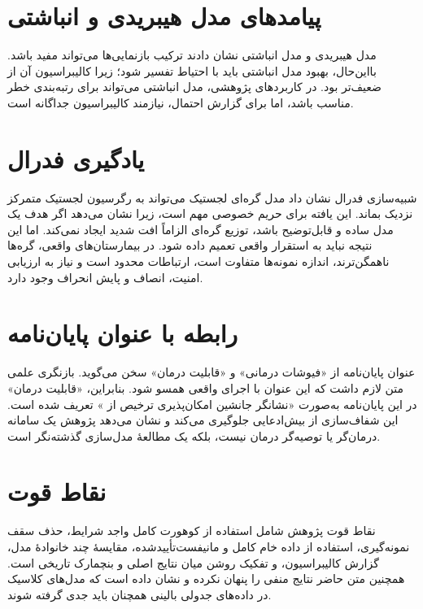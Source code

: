 \section{پیامدهای مدل هیبریدی و انباشتی}
مدل هیبریدی و مدل انباشتی نشان دادند ترکیب بازنمایی‌ها می‌تواند مفید باشد. بااین‌حال، بهبود مدل انباشتی باید با احتیاط تفسیر شود؛ زیرا کالیبراسیون آن از  ضعیف‌تر بود. در کاربردهای پژوهشی، مدل انباشتی می‌تواند برای رتبه‌بندی خطر مناسب باشد، اما برای گزارش احتمال، نیازمند کالیبراسیون جداگانه است.

\section{یادگیری فدرال}
شبیه‌سازی فدرال نشان داد مدل گره‌ای لجستیک می‌تواند به رگرسیون لجستیک متمرکز نزدیک بماند. این یافته برای حریم خصوصی مهم است، زیرا نشان می‌دهد اگر هدف یک مدل ساده و قابل‌توضیح باشد، توزیع گره‌ای الزاماً افت شدید ایجاد نمی‌کند. اما این نتیجه نباید به استقرار واقعی تعمیم داده شود. در بیمارستان‌های واقعی، گره‌ها ناهمگن‌ترند، اندازه نمونه‌ها متفاوت است، ارتباطات محدود است و نیاز به ارزیابی امنیت، انصاف و پایش انحراف وجود دارد.

\section{رابطه با عنوان پایان‌نامه}
عنوان پایان‌نامه از «فیوشات درمانی» و «قابلیت درمان» سخن می‌گوید. بازنگری علمی متن لازم داشت که این عنوان با اجرای واقعی همسو شود. بنابراین، «قابلیت درمان» در این پایان‌نامه به‌صورت «نشانگر جانشین امکان‌پذیری ترخیص از » تعریف شده است. این شفاف‌سازی از بیش‌ادعایی جلوگیری می‌کند و نشان می‌دهد پژوهش یک سامانه درمان‌گر یا توصیه‌گر درمان نیست، بلکه یک مطالعۀ مدل‌سازی گذشته‌نگر است.

\section{نقاط قوت}
نقاط قوت پژوهش شامل استفاده از کوهورت کامل واجد شرایط، حذف سقف نمونه‌گیری، استفاده از داده خام کامل و مانیفست‌تأییدشده، مقایسۀ چند خانوادۀ مدل، گزارش کالیبراسیون، و تفکیک روشن میان نتایج اصلی و بنچمارک تاریخی است. همچنین متن حاضر نتایج منفی را پنهان نکرده و نشان داده است که مدل‌های کلاسیک در داده‌های جدولی بالینی همچنان باید جدی گرفته شوند.

